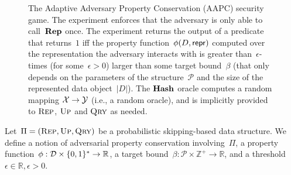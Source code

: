 \begin{figure}[h]
\begin{pchstack}[boxed,center,space=0.5em]
\begin{pcvstack}[space=0.45em]

	\end{pcvstack}
 \end{pchstack}


  \caption[The AAPC Security Model.]{The Adaptive Adversary Property Conservation (AAPC) security game. The experiment enforces that the adversary is only able to call~$\textup{\textbf{Rep}}\hspace{0.5pt}$ once. The experiment returns the output of a predicate that returns~$1$ iff the property function~$\phi(D,\mathsf{repr})$ computed over the representation the adversary interacts with is greater than~$\epsilon$-times (for some~$\epsilon > 0$) larger than some target bound~$\beta$ (that only depends on the parameters of the structure~$\mathcal{P}$ and the size of the represented data object~$|D|$). The $\textup{\textbf{Hash}}\hspace{0.5pt}$ oracle computes a random mapping $\mathcal{X}\to\mathcal{Y}$ (i.e., a random oracle), and is implicitly provided to $\textnormal{\textsc{Rep}}$, $\textnormal{\textsc{Up}}$ and $\textnormal{\textsc{Qry}}$ as needed.}
  \label{fig:aapc}
\end{figure}

Let~$\Pi = (\textnormal{\textsc{Rep}},\textnormal{\textsc{Up}},\textnormal{\textsc{Qry}})$ be a probabilistic skipping-based  data structure. We define a notion of adversarial property conservation involving~$\Pi$, a property function~$\phi : \mathcal{D} \times \{0,1\}^{*} \rightarrow \mathbb{R}$, a target bound~$\beta : \mathcal{P} \times \mathbb{Z}^{+} \rightarrow \mathbb{R}$, and a threshold $\epsilon \in \mathbb{R},\epsilon > 0$.   


